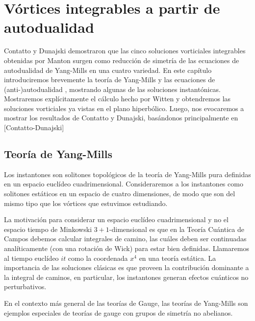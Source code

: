 
\chapter{Vórtices integrables a partir de autodualidad} %

\label{ch:selfduality} %


Contatto y Dunajski demostraron que las cinco soluciones vorticiales integrables obtenidas por Manton surgen como reducción de simetría de las ecuaciones de autodualidad de Yang-Mills en una cuatro variedad. En este capítulo introduciremos brevemente la teoría de Yang-Mills y las ecuaciones de (anti-)autodualidad , mostrando algunas de las soluciones instantónicas. Mostraremos explícitamente el cálculo hecho por Witten y obtendremos las soluciones vorticiales ya vistas en el plano hiperbólico. Luego, nos evocaremos a mostrar los resultados de Contatto y Dunajski, basándonos principalmente en [Contatto-Dunajski]

\section{Teoría de Yang-Mills}

Los instantones son solitones topológicos de la teoría de Yang-Mills pura definidas en un espacio euclídeo cuadrimensional. Consideraremos a los instantones como solitones estáticos en un espacio de cuatro dimensiones, de modo que son del mismo tipo que los vórtices que estuvimos estudiando.

La motivación para considerar un espacio euclídeo cuadrimensional y no el espacio tiempo de Minkowski $3+1$-dimensional es que en la Teoría Cuántica de Campos debemos calcular integrales de camino, las cuáles deben ser continuadas analíticamente (con una rotación de Wick) para estar bien definidas. Llamaremos al tiempo euclídeo $it$ como la coordenada $x^4$ en una teoría estática. La importancia de las soluciones clásicas es que proveen la contribución dominante a la integral de caminos, en particular, los instantones generan efectos cuánticos no perturbativos.

En el contexto más general de las teorías de Gauge, las teorías de Yang-Mills son ejemplos especiales de teorías de gauge con grupos de simetría no abelianos.

